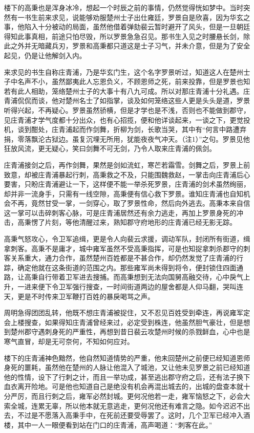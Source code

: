 楼下的高秉也是浑身冰冷，想起一个时辰之前的事情，仍然觉得恍如梦中。当时突然有一书生前来求见，说能够劝服楚州士子出仕雍廷，罗景自是欣喜，因为华玄之事，他陷入十分被动的局面，虽然他借着弹劾裴云暂时避开了风头，但是一旦朝廷得知此事真相，前途只怕尽毁，所以罗景急急召见。那书生入见之时腰悬长剑，除此之外并无暗藏兵刃，罗景和高秉都只道这是士子习气，并未介意，但是为了安全起见，仍是让他解剑入内。

来求见的书生自称庄青浦，乃是华玄门生，这个名字罗景听过，知道这人在楚州士子中名声不小，虽然鄙夷此人忘恩负义，不顾恩师之死，前来投靠，但是罗景也知若有此人相助，笼络楚州士子的大事十有八九可成。所以对那庄青浦十分礼遇。庄青浦侃侃而谈，他对楚州名士了如指掌，谈及如何笼络这些人更是头头是道，罗景听得兴起，不再疑心。罗景虽然骄横，但是才学也是不浅，否则也不能做到郡守，见庄青浦才学气度都十分出众，也有心招揽，便和他详谈起来，一谈之下，更觉投机，谈到酣处，庄青浦起而作剑舞，折柳为剑，长歌当哭，其中有“何言中路遭弃捐，零落飘沦古狱边。虽复沉埋无所用，犹能夜夜气冲天。（注1）”之句。罗景见他狂放风流，更无疑心，笑曰剑舞不可无剑，乃令人取来庄青浦的佩剑。

庄青浦接剑之后，再作剑舞，果然是剑如流虹，寒芒若霜雪。剑舞之后，罗景上前致意，却被庄青浦暴起行刺，高秉救之不及，只能围魏救赵，一掌击向庄青浦后心要害，只盼庄青浦避让一下，这样便不能一举杀死罗景，庄青浦的剑术虽然绚丽，却并非一流身手，只需有一线空隙，高秉便有信心救下罗景。谁知庄青浦也自知机会不再，竟然甘受一掌，一剑穿心，取了罗景性命，然后向外逃去。高秉本来自信这一掌可以击碎刺客心脉，可是庄青浦居然还有余力逃走，再加上罗景身死的冲击，高秉愣了片刻，等他清醒过来，熟知郡守府地形的庄青浦已经无影无踪。

高秉气怒攻心，令卫军追缉，更是令人向裴云求援，调动军队，封闭所有街道，缉拿刺客。高秉不是庸才，城中雍军虽然不受高秉指挥，可是也知捉拿刺杀郡守的刺客关系重大，通力合作，虽然楚州百姓都是不甚合作，却仍然发觉了庄青浦的行踪，确定他就在这条街道的范围之内。那些雍军尚未得到将令，便封锁住四面通路，让高秉自行带着卫军进去搜捕。而高秉想到无法向国舅高融交待，心中戾气上升，一进来便下令卫军强行搜查，一时间街道两边的屋舍都是人仰马翻，哭叫连天，更是不时传来卫军鞭打百姓的暴戾喝骂之声。

周明急得团团乱转，他既不想庄青浦被捉住，又不忍见百姓受到牵连，再说雍军定会上楼搜查，如果得知庄青浦曾经来过，必定受到株连，他虽然胆气豪壮，但是想到楚州郡守遇刺身死的严重性，再想到昔日裴云攻楚州时候的杀戮鲜血，心中也是寒气直冒，却是无可奈何，不知如何应对。

楼下的庄青浦神色黯然，他自然知道情势的严重，他未回楚州之前便已经知道恩师身死的噩耗，虽然他在楚州的人脉让他混入了城池，又让他未见罗景之前已经知道他的性情，设下了行刺之计，而且一举功成，甚至逃出郡守府之后，还有法子换下血衣离开险地。可是他也知道自己是绝没有机会再混出城去的，出城的盘查本就十分严厉，而且行刺之后，雍军必然封城。更何况他若一走，雍军恼怒之下，必会大索全城，连累无辜，所以他本就无意逃走，更何况他还有难言之隐。如今迟迟不出去，不过是不愿落入高秉手中，在死前还要受辱罢了。这时，几个卫军已经冲入酒楼，其中一人一眼便看到站在门口的庄青浦，高声喝道：“刺客在此。”

